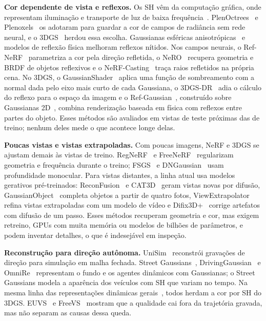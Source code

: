 \documentclass[conference]{IEEEtran}
\begin{document}
\textbf{Cor dependente de vista e reflexos.} Os SH vêm da computação gráfica, onde representam iluminação e transporte de luz de baixa frequência~\cite{ramamoorthi2001irradiance,sloan2002prt}. PlenOctrees~\cite{yu2021plenoctrees} e Plenoxels~\cite{fridovich2022plenoxels} os adotaram para guardar a cor de campos de radiância sem rede neural, e o 3DGS~\cite{kerbl2023} herdou essa escolha. Gaussianas esféricas anisotrópicas~\cite{yang2024spec} e modelos de reflexão física melhoram reflexos nítidos. Nos campos neurais, o Ref-NeRF~\cite{verbin2022refnerf} parametriza a cor pela direção refletida, o NeRO~\cite{liu2023nero} recupera geometria e BRDF de objetos reflexivos e o NeRF-Casting~\cite{verbin2024nerfcasting} traça raios refletidos na própria cena. No 3DGS, o GaussianShader~\cite{jiang2024gshader} aplica uma função de sombreamento com a normal dada pelo eixo mais curto de cada Gaussiana, o 3DGS-DR~\cite{ye2024gsdr} adia o cálculo do reflexo para o espaço da imagem e o Ref-Gaussian~\cite{yao2025refgaussian}, construído sobre Gaussianas 2D~\cite{huang2024gs2d}, combina renderização baseada em física com reflexos entre partes do objeto. Esses métodos são avaliados em vistas de teste próximas das de treino; nenhum deles mede o que acontece longe delas.

\textbf{Poucas vistas e vistas extrapoladas.} Com poucas imagens, NeRF e 3DGS se ajustam demais às vistas de treino. RegNeRF~\cite{niemeyer2022regnerf} e FreeNeRF~\cite{yang2023freenerf} regularizam geometria e frequência durante o treino; FSGS~\cite{zhu2024fsgs} e DNGaussian~\cite{li2024dngaussian} usam profundidade monocular. Para vistas distantes, a linha atual usa modelos gerativos pré-treinados: ReconFusion~\cite{wu2024reconfusion} e CAT3D~\cite{gao2024cat3d} geram vistas novas por difusão, GaussianObject~\cite{yang2024gaussianobject} completa objetos a partir de quatro fotos, ViewExtrapolator~\cite{liu2024viewextrapolator} refina vistas extrapoladas com um modelo de vídeo e Difix3D+~\cite{wu2025difix3d} corrige artefatos com difusão de um passo. Esses métodos recuperam geometria e cor, mas exigem retreino, GPUs com muita memória ou modelos de bilhões de parâmetros, e podem inventar detalhes, o que é indesejável em inspeção.

\textbf{Reconstrução para direção autônoma.} UniSim~\cite{yang2023unisim} reconstrói gravações de direção para simulação em malha fechada. Street Gaussians~\cite{yan2024streetgs}, DrivingGaussian~\cite{zhou2024drivinggaussian} e OmniRe~\cite{chen2025omnire} representam o fundo e os agentes dinâmicos com Gaussianas; o Street Gaussians modela a aparência dos veículos com SH que variam no tempo. Na mesma linha das representações dinâmicas gerais~\cite{wu2024gs4d}, todos herdam a cor por SH do 3DGS. EUVS~\cite{han2025euvs} e FreeVS~\cite{wang2025freevs} mostram que a qualidade cai fora da trajetória gravada, mas não separam as causas dessa queda.
\end{document}
